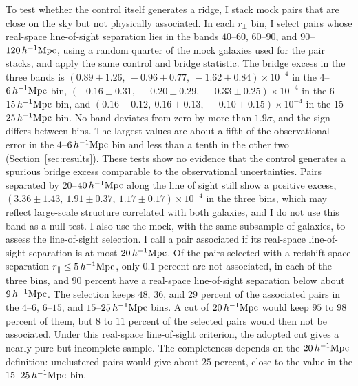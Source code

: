 \documentclass[11pt,letterpaper]{article}
\newcommand{\hinvMpc}{h^{-1}{\rm Mpc}}
\begin{document}
To test whether the control itself generates a ridge, I stack mock pairs
that are close on the sky but not physically associated. In each
$r_{\perp}$ bin, I select pairs whose real-space line-of-sight separation
lies in the bands $40$--$60$, $60$--$90$, and $90$--$120\,\hinvMpc$, using a
random quarter of the mock galaxies used for the pair stacks, and apply the
same control and bridge statistic. The bridge excess in the three bands is
$(0.89\pm1.26,\allowbreak\ -0.96\pm0.77,\allowbreak\ -1.62\pm0.84)\times10^{-4}$ in the
$4$--$6\,\hinvMpc$ bin,
$(-0.16\pm0.31,\allowbreak\ -0.20\pm0.29,\allowbreak\ -0.33\pm0.25)\times10^{-4}$ in the
$6$--$15\,\hinvMpc$ bin, and
$(0.16\pm0.12,\allowbreak\ 0.16\pm0.13,\allowbreak\ -0.10\pm0.15)\times10^{-4}$ in the
$15$--$25\,\hinvMpc$ bin. No band deviates from zero by more than
$1.9\sigma$, and the sign differs between bins. The largest values are about
a fifth of the observational error in the $4$--$6\,\hinvMpc$ bin and less
than a tenth in the other two (Section~\ref{sec:results}). These tests show
no evidence that the control generates a spurious bridge excess comparable
to the observational uncertainties. Pairs separated by $20$--$40\,\hinvMpc$ along the line of sight
still show a positive excess,
$(3.36\pm1.43,\allowbreak\ 1.91\pm0.37,\allowbreak\ 1.17\pm0.17)\times10^{-4}$ in the
three bins, which may reflect large-scale structure correlated with both
galaxies, and I do not use this band as a null test.
I also use the mock, with the same subsample of galaxies, to assess the
line-of-sight selection. I call a pair associated if its real-space
line-of-sight separation is at most $20\,\hinvMpc$. Of the pairs selected
with a redshift-space separation $r_{\parallel}\leq5\,\hinvMpc$, only $0.1$
percent are not associated, in each of the three bins, and $90$ percent have
a real-space line-of-sight separation below about $9\,\hinvMpc$. The selection keeps $48$,
$36$, and $29$ percent of the associated pairs in the $4$--$6$, $6$--$15$,
and $15$--$25\,\hinvMpc$ bins. A cut of $20\,\hinvMpc$ would keep $95$ to
$98$ percent of them, but $8$ to $11$ percent of the selected pairs would
then not be associated. Under this real-space line-of-sight criterion, the
adopted cut gives a nearly pure but
incomplete sample. The completeness depends on the $20\,\hinvMpc$
definition: unclustered pairs would give about $25$ percent, close to the
value in the $15$--$25\,\hinvMpc$ bin.
\end{document}
